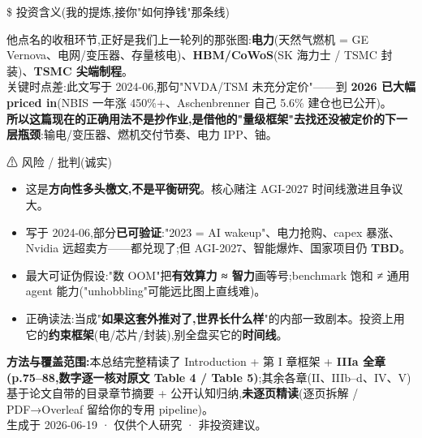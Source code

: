 \$ 投资含义(我的提炼,接你"如何挣钱"那条线)

他点名的收租环节,正好是我们上一轮列的那张图:\textbf{电力}(天然气燃机 = GE Vernova、电网/变压器、存量核电)、\textbf{HBM/CoWoS}(SK 海力士 / TSMC 封装)、\textbf{TSMC 尖端制程}。\\
关键时点差:此文写于 2024-06,那句"NVDA/TSM 未充分定价"------到 \textbf{2026 已大幅 priced in}(NBIS 一年涨 450\%+、Aschenbrenner 自己 5.6\% 建仓也已公开)。\\
\textbf{所以这篇现在的正确用法不是抄作业,是借他的"量级框架"去找还没被定价的下一层瓶颈}:输电/变压器、燃机交付节奏、电力 IPP、铀。

⚠ 风险 / 批判(诚实)

\begin{itemize}
\tightlist
\item
  这是\textbf{方向性多头檄文,不是平衡研究}。核心赌注 AGI-2027 时间线激进且争议大。
\item
  写于 2024-06,部分\textbf{已可验证}:"2023 = AI wakeup"、电力抢购、capex 暴涨、Nvidia 远超卖方------都兑现了;但 AGI-2027、智能爆炸、国家项目仍 \textbf{TBD}。
\item
  最大可证伪假设:"数 OOM"把\textbf{有效算力 ≈ 智力}画等号;benchmark 饱和 ≠ 通用 agent 能力("unhobbling"可能远比图上直线难)。
\item
  正确读法:当成"\textbf{如果这套外推对了,世界长什么样}"的内部一致剧本。投资上用它的\textbf{约束框架}(电/芯片/封装),别全盘买它的\textbf{时间线}。
\end{itemize}

\textbf{方法与覆盖范围:}本总结完整精读了 Introduction + 第 I 章框架 + \textbf{IIIa 全章(p.75--88,数字逐一核对原文 Table 4 / Table 5)};其余各章(II、IIIb--d、IV、V)基于论文自带的目录章节摘要 + 公开认知归纳,\textbf{未逐页精读}(逐页拆解 / PDF→Overleaf 留给你的专用 pipeline)。\\
生成于 2026-06-19 · 仅供个人研究 · 非投资建议。
